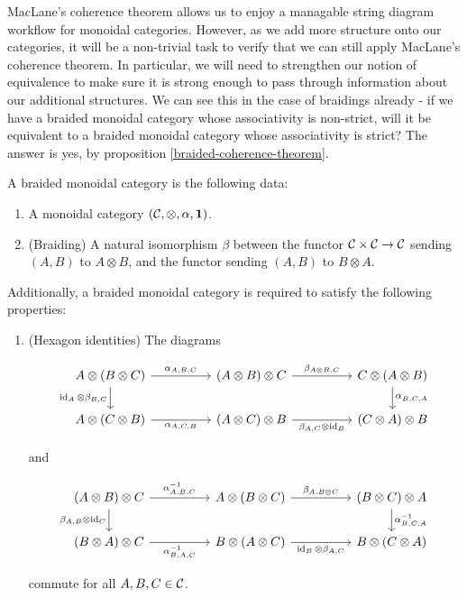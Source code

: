 \begin{rem}
MacLane's coherence theorem allows us to enjoy a managable string diagram workflow for monoidal categories. However, as we add more structure onto our categories, it will be a non-trivial task to verify that we can still apply MacLane's coherence theorem. In particular, we will need to strengthen our notion of equivalence to make sure it is strong enough to pass through information about our additional structures. We can see this in the case of braidings already - if we have a braided monoidal category whose associativity is non-strict, will it be equivalent to a braided monoidal category whose associativity is strict? The answer is yes, by proposition \ref{braided-coherence-theorem}.
\end{rem}


\begin{defn} A braided monoidal category is the following data:

\begin{enumerate}
\item A monoidal category $({\mathcal C},\otimes,\alpha, {\mathbf 1})$.
\item (Braiding) A natural isomorphism $\beta$ between the functor ${\mathcal C}\times {\mathcal C}\to {\mathcal C}$ sending $(A,B)$ to $A\otimes B$, and the functor sending $(A,B)$ to $B\otimes A$.
\end{enumerate}

Additionally, a braided monoidal category is required to satisfy the following properties:

\begin{enumerate}
\item (Hexagon identities) The diagrams

\[\begin{tikzcd}
	{A\otimes (B\otimes C)} && {(A\otimes B)\otimes C} && {C\otimes (A\otimes B)} \\
	{A\otimes (C\otimes B)} && {(A\otimes C)\otimes B} && {(C\otimes A)\otimes B}
	\arrow["{\alpha_{A,B,C}}", from=1-1, to=1-3]
	\arrow["{\beta_{A\otimes B,C}}", from=1-3, to=1-5]
	\arrow["{\alpha^{}_{B,C,A}}", from=1-5, to=2-5]
	\arrow["{\id_A\otimes \beta_{B,C}}"', from=1-1, to=2-1]
	\arrow["{\alpha_{A,C,B}}"', from=2-1, to=2-3]
	\arrow["{\beta_{A,C}\otimes \id_B}"', from=2-3, to=2-5]
\end{tikzcd}\]

and

\[\begin{tikzcd}
	{(A\otimes B)\otimes C} && {A\otimes (B\otimes C)} && {(B\otimes C)\otimes A} \\
	{(B\otimes A)\otimes C} && {B\otimes (A\otimes C)} && {B\otimes (C\otimes A)}
	\arrow["{\alpha^{-1}_{A,B,C}}", from=1-1, to=1-3]
	\arrow["{\beta_{A,B\otimes C}}", from=1-3, to=1-5]
	\arrow["{\alpha^{-1}_{B,C,A}}", from=1-5, to=2-5]
	\arrow["{\beta_{A,B}\otimes \id_C}"', from=1-1, to=2-1]
	\arrow["{\alpha^{-1}_{B,A,C}}"', from=2-1, to=2-3]
	\arrow["{\id_B\otimes \beta_{A,C}}"', from=2-3, to=2-5]
\end{tikzcd}\]

commute for all $A,B,C\in {\mathcal C}$.
\end{enumerate}


\end{defn}

